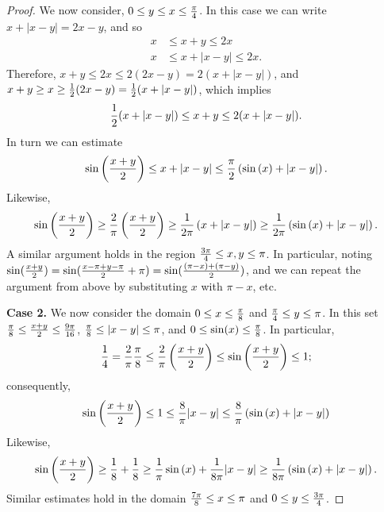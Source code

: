\documentclass{amsart}
\begin{document}
\begin{proof}
We now consider, $0 \leq y \leq x \leq {\pi \over 4}$.  In this case we can write $x + |x-y| = 2x - y$, and so
\begin{align*}
    x &\leq x+ y \leq 2x\\
     x & \leq x + |x - y| \leq 2x.  
\end{align*}
Therefore, $x+ y  \leq 2 x \leq 2 ( 2 x - y)= 2 ( x + |x -y|)$, 
and $x+ y \geq x \geq {1\over 2} ( 2 x - y) = {1\over 2} ( x + |x -y|)$, 
which implies
\begin{align*}
    {1\over 2} ( x + |x -y|) \leq x + y \leq 2 ( x + |x -y|).
\end{align*}
In turn we can estimate 
\begin{align*}
\sin \left( {x + y\over 2} \right)  
 \leq x + |x -y| 
\leq {\pi\over 2} \left( \sin\left( x\right) + |x - y|  \right). 
\end{align*}
Likewise, 
\begin{align*}
\sin \left( {x + y\over 2} \right)  
 \geq {2 \over \pi} \left( {x + y \over 2} \right) 
\geq {1\over 2 \pi} \left( x + |x -y| \right)
\geq {1\over 2\pi} \left( \sin\left( x \right) + |x - y|  \right). 
\end{align*}
A similar argument holds in the region ${3 \pi \over4 } \leq x,y \leq \pi$. In particular, noting $\sin({x+y\over2}) = \sin({x-\pi+y-\pi\over2}+\pi) = \sin({(\pi - x )+ (\pi-y)\over2})$, and we can repeat the argument from above by substituting $x$ with $\pi - x$, etc.

\textbf{Case 2.} We now consider the domain $0 \leq x \leq {\pi \over 8}$ and ${\pi \over 4} \leq y \leq \pi$.  In this set 
${\pi \over 8} \leq {x+y\over 2} \leq {9 \pi \over 16}$,  ${\pi \over 8} \leq |x -y| \leq \pi$, and $0\leq \sin(x) \leq {\pi \over 8}$.  In particular,
\[
{1\over 4} = {2 \over \pi} {\pi \over 8} \leq {2 \over \pi}\left( {x + y\over 2} \right) \leq \sin \left( {x + y\over 2} \right)
\leq 1 ;
\]
consequently, 
\begin{align*}
\sin\left( {x + y\over 2} \right)
\leq 1 \leq {8 \over \pi} |x - y| \leq {8 \over \pi} \left( \sin\left( x \right) + |x - y|  \right)
\end{align*}
Likewise,
\begin{align*}
\sin\left( {x + y\over 2} \right)
\geq {1\over 8} + {1\over 8} \geq
{1\over \pi} \sin\left( x\right) + {1\over 8 \pi} |x-y| \geq {1\over 8 \pi}\left( \sin\left( x\right) + |x - y| \right).
\end{align*}
Similar estimates hold in the domain ${7\pi \over 8} \leq x \leq {\pi }$ and ${0} \leq y \leq {3\pi \over 4}$.  


\end{proof}
\end{document}
